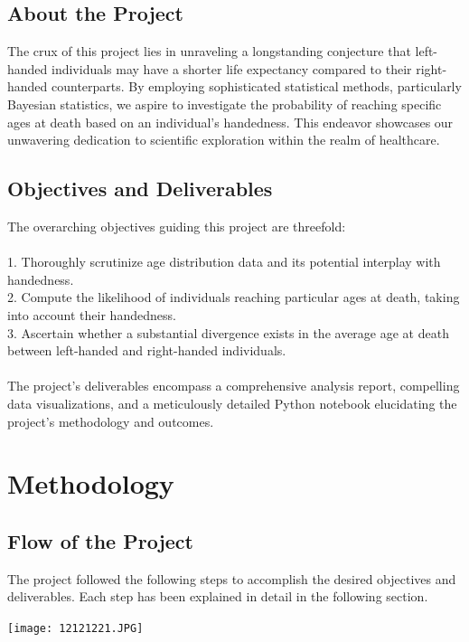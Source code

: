 \documentclass{article}
\begin{document}
\subsection{About the Project} 
The crux of this project lies in unraveling a longstanding conjecture that left-handed individuals may have a shorter life expectancy compared to their right-handed counterparts. By employing sophisticated statistical methods, particularly Bayesian statistics, we aspire to investigate the probability of reaching specific ages at death based on an individual's handedness. This endeavor showcases our unwavering dedication to scientific exploration within the realm of healthcare. 

\subsection{Objectives and Deliverables}
The overarching objectives guiding this project are threefold:\\ \\1. Thoroughly scrutinize age distribution data and its potential interplay with handedness.\\ 2. Compute the likelihood of individuals reaching particular ages at death, taking into account their handedness.\\ 3. Ascertain whether a substantial divergence exists in the average age at death between left-handed and right-handed individuals. \\ \\ The project's deliverables encompass a comprehensive analysis report, compelling data visualizations, and a meticulously detailed Python notebook elucidating the project's methodology and outcomes. 


\newpage
\section{Methodology}
\subsection{Flow of the Project}
The project followed the following steps to accomplish the desired objectives and deliverables. Each step has been explained in detail in the following section. 
\vspace{2cm}
        \begin{center}
            \texttt{[image: 12121221.JPG]}\\
        \end{center}
\end{document}
